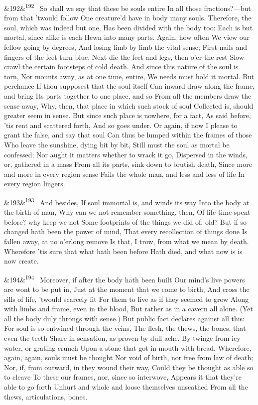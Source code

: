 \documentclass[12pt]{article}
\newcommand{\para}[1][]{\par\noindent\ifx&#1&\else\textsuperscript{\footnotesize #1}~\fi}
\begin{document}
\para[192] So shall we say that these be souls entire In all those fractions?---but from that 'twould follow One creature'd have in body many souls. Therefore, the soul, which was indeed but one, Has been divided with the body too: Each is but mortal, since alike is each Hewn into many parts. Again, how often We view our fellow going by degrees, And losing limb by limb the vital sense; First nails and fingers of the feet turn blue, Next die the feet and legs, then o'er the rest Slow crawl the certain footsteps of cold death. And since this nature of the soul is torn, Nor mounts away, as at one time, entire, We needs must hold it mortal. But perchance If thou supposest that the soul itself Can inward draw along the frame, and bring Its parts together to one place, and so From all the members draw the sense away, Why, then, that place in which such stock of soul Collected is, should greater seem in sense. But since such place is nowhere, for a fact, As said before, 'tis rent and scattered forth, And so goes under. Or again, if now I please to grant the false, and say that soul Can thus be lumped within the frames of those Who leave the sunshine, dying bit by bit, Still must the soul as mortal be confessed; Nor aught it matters whether to wrack it go, Dispersed in the winds, or, gathered in a mass From all its parts, sink down to brutish death, Since more and more in every region sense Fails the whole man, and less and less of life In every region lingers.

\para[193] And besides, If soul immortal is, and winds its way Into the body at the birth of man, Why can we not remember something, then, Of life-time spent before? why keep we not Some footprints of the things we did of, old? But if so changed hath been the power of mind, That every recollection of things done Is fallen away, at no o'erlong remove Is that, I trow, from what we mean by death. Wherefore 'tis sure that what hath been before Hath died, and what now is is now create.

\para[194] Moreover, if after the body hath been built Our mind's live powers are wont to be put in, Just at the moment that we come to birth, And cross the sills of life, 'twould scarcely fit For them to live as if they seemed to grow Along with limbs and frame, even in the blood, But rather as in a cavern all alone. (Yet all the body duly throngs with sense.) But public fact declares against all this: For soul is so entwined through the veins, The flesh, the thews, the bones, that even the teeth Share in sensation, as proven by dull ache, By twinge from icy water, or grating crunch Upon a stone that got in mouth with bread. Wherefore, again, again, souls must be thought Nor void of birth, nor free from law of death; Nor, if, from outward, in they wound their way, Could they be thought as able so to cleave To these our frames, nor, since so interwove, Appears it that they're able to go forth Unhurt and whole and loose themselves unscathed From all the thews, articulations, bones.
\end{document}
